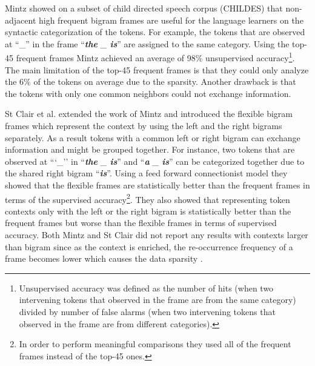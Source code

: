 Mintz  showed on a subset of child
directed speech corpus (CHILDES) \cite{macwhinney2000childes} that
non-adjacent high frequent bigram frames are useful for the language
learners on the syntactic categorization of the tokens.  For example,
the tokens that are observed at ``\_'' in the frame ``{\em {\bf the}
  \_ {\bf is}}'' are assigned to the same category.  Using the top-45
frequent frames Mintz achieved an average of 98\% unsupervised
accuracy\footnote{Unsupervised accuracy was defined as the number of
  hits (when two intervening tokens that observed in the frame are
  from the same category) divided by number of false alarms (when two
  intervening tokens that observed in the frame are from different
  categories).}.  The main limitation of the top-45 frequent frames is
that they could only analyze the 6\% of the tokens on average due to
the sparsity.  Another drawback is that the tokens with only one
common neighbors could not exchange information.

St Clair et al.   extended the work of Mintz
 and introduced the flexible bigram
frames which represent the context by using the left and the right
bigrams separately.  As a result tokens with a common left or right
bigram can exchange information and might be grouped together.  For
instance, two tokens that are observed at ```\_'' in ``{\em {\bf the}
  \_ {\bf is}}'' and ``{\em {\bf a} \_ {\bf is}}'' can be categorized
together due to the shared right bigram ``{\em{\bf is}}''.  Using a
feed forward connectionist model they showed that the flexible frames
are statistically better than the frequent frames in terms of the
supervised accuracy\footnote{In order to perform meaningful
  comparisons they used all of the frequent frames instead of the
  top-45 ones.}.  They also showed that representing token contexts
only with the left or the right bigram is statistically better than
the frequent frames but worse than the flexible frames in terms of
supervised accuracy.  Both Mintz  and St
Clair  did not report any results with contexts
larger than bigram since as the context is enriched, the re-occurrence
frequency of a frame becomes lower which causes the data sparsity
\cite{manning99foundations}.


